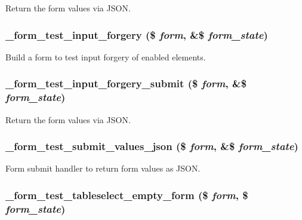 \label{form__test_8module_a8a30d2b9d8bbb078944a86e85d28ac0c}
Return the form values via JSON. \hypertarget{form__test_8module_acd16d98f3f29567983f09d9d642bb414}{
\subsubsection[{\_\-form\_\-test\_\-input\_\-forgery}]{\setlength{\rightskip}{0pt plus 5cm}\_\-form\_\-test\_\-input\_\-forgery (\$ {\em form}, \/  \&\$ {\em form\_\-state})}}
\label{form__test_8module_acd16d98f3f29567983f09d9d642bb414}
Build a form to test input forgery of enabled elements. \hypertarget{form__test_8module_ac111e11abcbd435a11af8ae38f20f7d5}{
\subsubsection[{\_\-form\_\-test\_\-input\_\-forgery\_\-submit}]{\setlength{\rightskip}{0pt plus 5cm}\_\-form\_\-test\_\-input\_\-forgery\_\-submit (\$ {\em form}, \/  \&\$ {\em form\_\-state})}}
\label{form__test_8module_ac111e11abcbd435a11af8ae38f20f7d5}
Return the form values via JSON. \hypertarget{form__test_8module_a3e98d202f2701cac2cf93649f81d6330}{
\subsubsection[{\_\-form\_\-test\_\-submit\_\-values\_\-json}]{\setlength{\rightskip}{0pt plus 5cm}\_\-form\_\-test\_\-submit\_\-values\_\-json (\$ {\em form}, \/  \&\$ {\em form\_\-state})}}
\label{form__test_8module_a3e98d202f2701cac2cf93649f81d6330}
Form submit handler to return form values as JSON. \hypertarget{form__test_8module_a6b3af3afe03e6da635cd4a22b97713af}{
\subsubsection[{\_\-form\_\-test\_\-tableselect\_\-empty\_\-form}]{\setlength{\rightskip}{0pt plus 5cm}\_\-form\_\-test\_\-tableselect\_\-empty\_\-form (\$ {\em form}, \/  \$ {\em form\_\-state})}}
